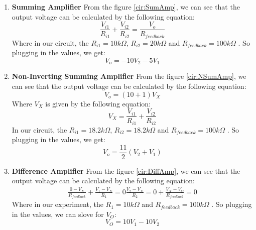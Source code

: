 \begin{enumerate}[a]
            \item \textbf{Summing Amplifier}\newline
                From the figure \ref{cir:SumAmp}, we can see that the output voltage can be calculated by the following equation:
                \begin{equation}
                    \frac{V_{i1}}{R_{i1}} + \frac{V_{i2}}{R_{i2}} = \frac{V_o}{R_{feedback}}
                \end{equation}
                Where in our circuit, the $R_{i1} = 10k \Omega$, $R_{i2} = 20k \Omega$ and $R_{feedback} = 100k \Omega$ . So plugging in the values, we get:
                \begin{equation}
                    V_o = -10V_2 - 5V_1
                    \label{eq:SumAmp_output}
                \end{equation}

            \item \textbf{Non-Inverting Summing Amplifier}\newline
                From the figure \ref{cir:NSumAmp}, we can see that the output voltage can be calculated by the following equation:
                \begin{equation}
                    V_o = (10+1)V_X
                \end{equation}
                Where $V_X$ is given by the following equation:
                \begin{equation}
                    V_X = \frac{V_{i1}}{R_{i1}} + \frac{V_{i2}}{R_{i2}}
                \end{equation}
                In our circuit, the $R_{i1} = 18.2k \Omega$, $R_{i2} = 18.2k \Omega$ and $R_{feedback} = 100k \Omega$ . So plugging in the values, we get:
                \begin{equation}
                    V_o = \frac{11}{2}(V_2+V_1)
                    \label{eq:NSumAmp_output}
                \end{equation}

            \item \textbf{Difference Amplifier}\newline
                From the figure \ref{cir:DiffAmp}, we can see that the output voltage can be calculated by the following equation:
                \begin{equation}
                    \begin {aligned}
                    \frac{0-V_X}{R_{feedback}} + \frac{V_1-V_X}{R_1} = 0
                    \frac{V_2-V_X}{R_{2}} = 0 + \frac{V_X-V_O}{R_{feedback}} = 0
                    \end {aligned}
                \end{equation}
                Where in our experiment, the $R_1 = 10k \Omega$ and $R_{feedback} = 100k \Omega$ . So plugging in the values, we can slove for $V_O$:
                \begin{equation}
                    V_O = 10V_1 - 10V_2
                    \label{eq:DiffAmp_output}
                \end{equation}
        \end{enumerate}

